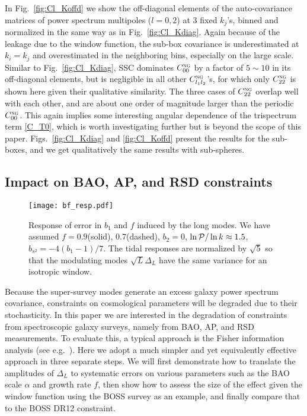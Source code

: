 \documentclass[a4paper,11pt]{article}
\let\d\relax
\DeclareMathOperator{\d}{d}
\newcommand{\Pdimless}{\mathcal{P}}
\newcommand{\nonGauss}{\textsc{ng}}
\begin{document}
In Fig.~\ref{fig:Cl_Koffd} we show the off-diagonal elements of the
auto-covariance matrices of power spectrum multipoles ($l=0,2$) at 3 fixed
$k_j$'s, binned and normalized in the same way as in Fig.~\ref{fig:Cl_Kdiag}.
Again because of the leakage due to the window function, the sub-box covariance
is underestimated at $k_i=k_j$ and overestimated in the neighboring bins,
especially on the large scale.
Similar to Fig.~\ref{fig:Cl_Kdiag}, SSC dominates $C^\nonGauss_{00}$ by a
factor of $5\sim10$ in its off-diagonal elements, but is negligible in all
other $C^\nonGauss_{l_1l_2}$'s, for which only $C^\nonGauss_{22}$ is shown here
given their qualitative similarity.
The three cases of $C^\nonGauss_{22}$ overlap well with each other, and are
about one order of magnitude larger than the periodic $C^\nonGauss_{00}$.
This again implies some interesting angular dependence of the trispectrum term
\eqref{C_T0}, which is worth investigating further but is beyond the scope of this
paper.
Figs.~\ref{fig:Cl_Kdiag} and \ref{fig:Cl_Koffd} present the results for the
sub-boxes, and we get qualitatively the same results with sub-spheres.



\subsection{Impact on BAO, AP, and RSD constraints}
\label{sub:impact}

\begin{figure}[tbp]
    \centering
    \texttt{[image: bf\_resp.pdf]}
    \caption{Response of error in $b_1$ and $f$ induced by the long modes.
    We have assumed $f=0.9$(solid), $0.7$(dashed), $b_2=0$, $\d\ln\Pdimless /
    \d\ln k\approx1.5$, $b_{s^2}=-4(b_1-1)/7$.  The tidal responses are
    normalized by $\sqrt 5$ so that the modulating modes $\sqrt L\Delta_L$ have the same variance for an
    isotropic window.}
    \label{fig:bf_resp}
\end{figure}

Because the super-survey modes generate an excess galaxy power spectrum
covariance, constraints on cosmological parameters will be degraded due to
their stochasticity.
In this paper we are interested in the degradation of constraints from
spectroscopic galaxy surveys, namely from BAO, AP, and RSD measurements.
To evaluate this, a typical approach is the Fisher information analysis (see e.g.\
\cite{LiHuEtAl14sss}).
Here we adopt a much simpler and yet equivalently effective approach in three
separate steps.
We will first demonstrate how to translate the amplitudes of $\Delta_L$ to
systematic errors on various parameters such as the BAO scale $\alpha$ and growth rate $f$, 
then show how
to assess the size of the effect given the window function using the BOSS survey as an
example, and finally compare that to the BOSS DR12 constraint.
\end{document}
